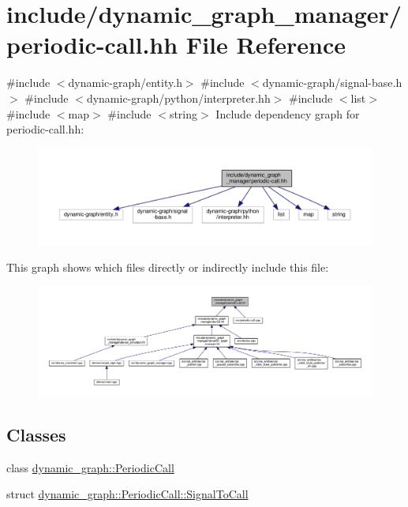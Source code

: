 \hypertarget{periodic-call_8hh}{}\section{include/dynamic\+\_\+graph\+\_\+manager/periodic-\/call.hh File Reference}
\label{periodic-call_8hh}
{\ttfamily \#include $<$dynamic-\/graph/entity.\+h$>$}\newline
{\ttfamily \#include $<$dynamic-\/graph/signal-\/base.\+h$>$}\newline
{\ttfamily \#include $<$dynamic-\/graph/python/interpreter.\+hh$>$}\newline
{\ttfamily \#include $<$list$>$}\newline
{\ttfamily \#include $<$map$>$}\newline
{\ttfamily \#include $<$string$>$}\newline
Include dependency graph for periodic-\/call.hh\+:
\nopagebreak
\begin{figure}[H]
\begin{center}
\leavevmode
\includegraphics[width=350pt]{periodic-call_8hh__incl}
\end{center}
\end{figure}
This graph shows which files directly or indirectly include this file\+:
\nopagebreak
\begin{figure}[H]
\begin{center}
\leavevmode
\includegraphics[width=350pt]{periodic-call_8hh__dep__incl}
\end{center}
\end{figure}
\subsection*{Classes}
\begin{DoxyCompactItemize}
\item 
class \hyperlink{classdynamic__graph_1_1PeriodicCall}{dynamic\+\_\+graph\+::\+Periodic\+Call}
\item 
struct \hyperlink{structdynamic__graph_1_1PeriodicCall_1_1SignalToCall}{dynamic\+\_\+graph\+::\+Periodic\+Call\+::\+Signal\+To\+Call}
\end{DoxyCompactItemize}
